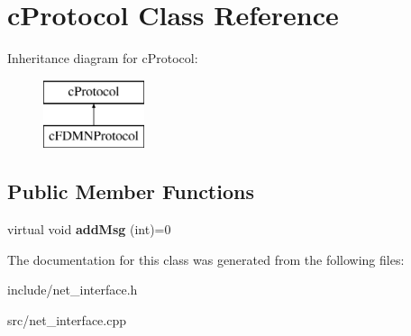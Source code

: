 \hypertarget{classcProtocol}{\section{c\-Protocol \-Class \-Reference}
\label{d0/dfe/classcProtocol}
}
\-Inheritance diagram for c\-Protocol\-:\begin{figure}[H]
\begin{center}
\leavevmode
\includegraphics[height=2.000000cm]{d0/dfe/classcProtocol}
\end{center}
\end{figure}
\subsection*{\-Public \-Member \-Functions}
\begin{DoxyCompactItemize}
\item 
\hypertarget{classcProtocol_ad3acd1123c6379a82c4b42fa9ad68d4b}{virtual void {\bfseries add\-Msg} (int)=0}\label{d0/dfe/classcProtocol_ad3acd1123c6379a82c4b42fa9ad68d4b}

\end{DoxyCompactItemize}


\-The documentation for this class was generated from the following files\-:\begin{DoxyCompactItemize}
\item 
include/net\-\_\-interface.\-h\item 
src/net\-\_\-interface.\-cpp\end{DoxyCompactItemize}

